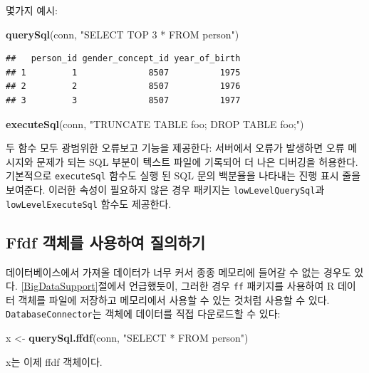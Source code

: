 \documentclass[11pt]{book}
\newenvironment{Shaded}{\begin{snugshade}}{\end{snugshade}}
\newcommand{\KeywordTok}[1]{\textcolor[rgb]{0.13,0.29,0.53}{\textbf{#1}}}
\newcommand{\StringTok}[1]{\textcolor[rgb]{0.31,0.60,0.02}{#1}}
\newcommand{\NormalTok}[1]{#1}
\theoremstyle{definition}
\theoremstyle{definition}
\theoremstyle{definition}
\theoremstyle{remark}
\begin{document}
몇가지 예시:

\begin{Shaded}
\begin{Highlighting}[]
\KeywordTok{querySql}\NormalTok{(conn, }\StringTok{"SELECT TOP 3 * FROM person"}\NormalTok{)}
\end{Highlighting}
\end{Shaded}

\begin{verbatim}
##   person_id gender_concept_id year_of_birth
## 1         1              8507          1975
## 2         2              8507          1976
## 3         3              8507          1977
\end{verbatim}

\begin{Shaded}
\begin{Highlighting}[]
\KeywordTok{executeSql}\NormalTok{(conn, }\StringTok{"TRUNCATE TABLE foo; DROP TABLE foo;"}\NormalTok{)}
\end{Highlighting}
\end{Shaded}

두 함수 모두 광범위한 오류보고 기능을 제공한다: 서버에서 오류가 발생하면
오류 메시지와 문제가 되는 SQL 부분이 텍스트 파일에 기록되어 더 나은
디버깅을 허용한다. 기본적으로 \texttt{executeSql} 함수도 실행 된 SQL
문의 백분율을 나타내는 진행 표시 줄을 보여준다. 이러한 속성이 필요하지
않은 경우 패키지는 \texttt{lowLevelQuerySql}과
\texttt{lowLevelExecuteSql} 함수도 제공한다.

\subsection{Ffdf 객체를 사용하여 질의하기}\label{ffdf---}

데이터베이스에서 가져올 데이터가 너무 커서 종종 메모리에 들어갈 수 없는
경우도 있다. \ref{BigDataSupport}절에서 언급했듯이, 그러한 경우
\texttt{ff} 패키지를 사용하여 R 데이터 객체를 파일에 저장하고 메모리에서
사용할 수 있는 것처럼 사용할 수 있다. \texttt{DatabaseConnector}는
객체에 데이터를 직접 다운로드할 수 있다:

\begin{Shaded}
\begin{Highlighting}[]
\NormalTok{x <-}\StringTok{ }\KeywordTok{querySql.ffdf}\NormalTok{(conn, }\StringTok{"SELECT * FROM person"}\NormalTok{)}
\end{Highlighting}
\end{Shaded}

x는 이제 ffdf 객체이다.
\end{document}
